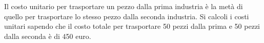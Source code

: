 Il costo unitario per trasportare un pezzo dalla 
prima industria \`e la met\`a di quello per trasportare
lo stesso pezzo dalla seconda industria.
Si calcoli i costi unitari sapendo che il
costo totale per trasportare 50 pezzi dalla prima
e 50 pezzi dalla seconda \`e di 450 euro.